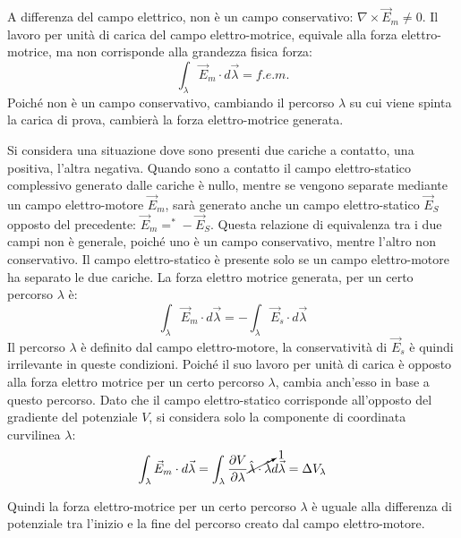\documentclass{article}
\numberwithin{equation}{subsection}
\begin{document}
A differenza del campo elettrico, non è un campo conservativo: $\nabla\times\vec{E}_m\neq0$. Il lavoro per unità di carica del campo elettro-motrice, equivale alla 
forza elettro-motrice, ma non corrisponde alla grandezza fisica forza:
\begin{equation*}
    \displaystyle\int_{\lambda}\vec{E}_m\cdot d\vec{\lambda}=f.e.m.
\end{equation*}
Poiché non è un campo conservativo, cambiando il percorso $\lambda$ su cui viene spinta la carica di prova, cambierà la forza elettro-motrice generata. 



Si considera una situazione dove sono presenti due cariche a contatto, una positiva, l'altra negativa. Quando sono a contatto il campo elettro-statico complessivo generato 
dalle cariche è nullo, mentre se vengono separate mediante un campo elettro-motore $\vec{E}_m$, sarà generato anche un campo elettro-statico $\vec{E}_S$ opposto del precedente: 
$\vec{E}_m=^*-\vec{E}_S$. Questa relazione di equivalenza tra i due campi non è generale, poiché uno è un campo conservativo, mentre l'altro non conservativo. Il campo 
elettro-statico è presente solo se un campo elettro-motore ha separato le due cariche. 
La forza elettro motrice generata, per un certo percorso $\lambda$ è:
\begin{equation*}
    \displaystyle\int_{\lambda}\vec{E}_m\cdot d\vec{\lambda}=-\int_{\lambda}\vec{E}_s\cdot d\vec{\lambda}
\end{equation*}
Il percorso $\lambda$ è definito dal campo elettro-motore, la conservatività di $\vec{E}_s$ è quindi irrilevante in queste condizioni. Poiché il suo lavoro per unità di carica 
è opposto alla forza elettro motrice per un certo percorso $\lambda$, cambia anch'esso in base a questo percorso. Dato che il campo elettro-statico corrisponde all'opposto del 
gradiente del potenziale $V$, si considera solo la componente di coordinata curvilinea $\lambda$: 
\begin{equation*}
    \displaystyle\int_{\lambda}\vec{E}_m\cdot d\vec{\lambda}=\int_{\lambda}\frac{\partial V}{\partial\lambda}\cancelto{1}{\hat{\lambda}\cdot\hat{\lambda}}d\vec{\lambda}=\Delta V_{\lambda}
\end{equation*}

Quindi la forza elettro-motrice per un certo percorso $\lambda$ è uguale alla differenza di potenziale tra l'inizio e la fine del percorso creato dal campo elettro-motore. 
 
\end{document}

